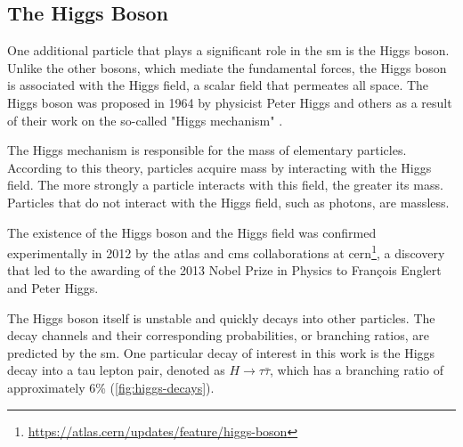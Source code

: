 \subsection{The Higgs Boson}

One additional particle that plays a significant role in the \gls{sm} is the Higgs boson. Unlike the other bosons,
which mediate the fundamental forces, the Higgs boson is associated with the Higgs field, a scalar field that permeates
all space. The Higgs boson was proposed in 1964 by physicist Peter Higgs and others as a result of their work on the
so-called "Higgs mechanism" \cite{higgs}.

The Higgs mechanism is responsible for the mass of elementary particles. According to this theory, particles acquire
mass by interacting with the Higgs field. The more strongly a particle interacts with this field, the greater its mass.
Particles that do not interact with the Higgs field, such as photons, are massless.

The existence of the Higgs boson and the Higgs field was confirmed experimentally in 2012 by the \gls{atlas} and \gls{cms}
collaborations at \gls{cern}\footnote{\url{https://atlas.cern/updates/feature/higgs-boson}}, a discovery that led to the
awarding of the 2013 Nobel Prize in Physics to François Englert and Peter Higgs.

The Higgs boson itself is unstable and quickly decays into other particles. The decay channels and their corresponding
probabilities, or branching ratios, are predicted by the \gls{sm}. One particular decay of interest in
this work is the Higgs decay into a tau lepton pair, denoted as $H \rightarrow \tau\bar{\tau}$, which has a branching
ratio of approximately 6\% (\autoref{fig:higgs-decays}).

